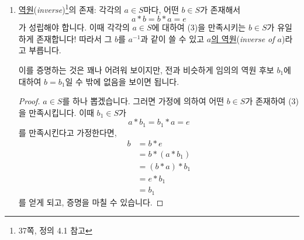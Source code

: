 \documentclass[12pt]{paper}
\begin{document}
\begin{enumerate}
    이렇게만 해도 충분한 이유를 생각해 봅시다.
    $e_1 \in S$이 $e$와 다르다면 항등원이어서는 안 된다는 걸 보이면,
    자동적으로 항등원은 $e$ 밖에 없게 됩니다.
    그런데 ``$e_1 \in S$이 $e$와 다르다면 항등원이서는 안 된다''의 대우 명제가 바로 ``$e_1 \in S$가 (2-1)을 만족시킨다면 $e = e_1$이다''이기 때문입니다.
    이제 본격적으로 증명을 해보도록 하겠습니다.

    \begin{proof}
      먼저, $e_1 \in S$를 하나 잡은 뒤 그 $e_1$이 (2-1)을 만족시킨다고 가정하겠습니다.
      그러면 (2)의 $a$ 자리에 $e_1$을 넣음으로써 $$e * e_1 = e_1 * e = e_1$$을 얻을 수 있고,
      (2-1)의 $a$ 자리에 $e$를 넣음으로써 $$e_1 * e = e * e_1 = e$$을 얻을 수 있습니다.
      따라서 $e_1 * e = e_1$이고 $e_1 * e = e$임을 알 수 있습니다.
      이것들로부터 $$e = e_1 * e = e_1$$를 얻게 되는데,
      이로써 ($e = e_1$을 보였기 때문에) 증명을 마칠 수 있습니다.
    \end{proof}

    \item \underline{역원}(\textit{inverse})\footnote{\cite{fraleigh2009} 37쪽, 정의 4.1 참고}의 존재:
    각각의 $a \in S$마다, 어떤 $b \in S$가 존재해서
    \begin{equation*}
      a * b = b * a = e \tag{3}
    \end{equation*}
    가 성립해야 합니다.
    이때 각각의 $a \in S$에 대하여 (3)을 만족시키는 $b \in S$가 유일하게 존재합니다!
    따라서 그 $b$를 $a^{-1}$과 같이 쓸 수 있고 \underline{$a$의 역원}(\textit{inverse of $a$})라고 부릅니다.

    이를 증명하는 것은 꽤나 어려워 보이지만,
    전과 비슷하게 임의의 역원 후보 $b_1$에 대하여 $b = b_1$일 수 밖에 없음을 보이면 됩니다.

    \begin{proof}
      $a \in S$를 하나 뽑겠습니다.
      그러면 가정에 의하여 어떤 $b \in S$가 존재하여 (3)을 만족시킵니다.
      이때 $b_1 \in S$가
      \begin{equation*}
        a * b_1 = b_1 * a = e \tag{3-1}
      \end{equation*}
      를 만족시킨다고 가정한다면,
      \begin{align*}
        b
        & = b * e \tag{2} \\
        & = b * (a * b_1) \tag{3-1} \\
        & = (b * a) * b_1 \tag{1} \\
        & = e * b_1 \tag{3} \\
        & = b_1 \tag{2}
      \end{align*}
      를 얻게 되고,
      증명을 마칠 수 있습니다.
    \end{proof}
  \end{enumerate}
\end{document}
